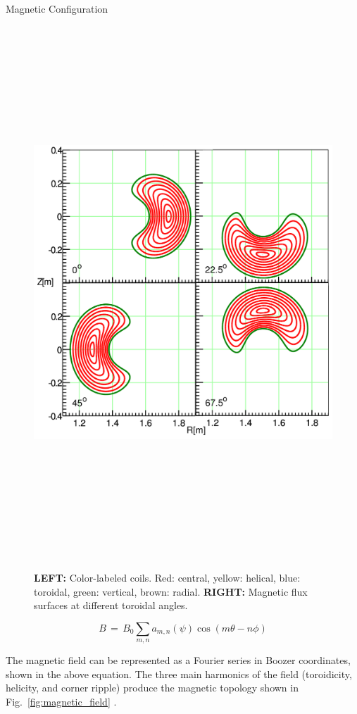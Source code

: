 \documentclass{beamer}
\newlength{\onecolwid}
\begin{document}
\begin{frame}[t]
\begin{columns}[t]
\begin{column}{\onecolwid}
\begin{block}{Magnetic Configuration}
\begin{figure}
{		\includegraphics[height=20cm]{../Graphics/flux_surfaces.png}
	}
	\caption{\textbf{LEFT:} Color-labeled coils. Red: central, yellow: helical, blue: toroidal, green: vertical, brown: radial. \textbf{RIGHT:} Magnetic flux surfaces at different toroidal angles.}
	\label{fig:magnetic_coils}
\end{figure}
\vspace{-0.2cm}
\begin{equation*}
	B \,=\, B_0 \sum_{m,n} a_{m,n}\left(\psi\right) \cos\left(m\theta - n\phi\right)
\end{equation*}

\hspace{32pt} The magnetic field can be represented as a Fourier series in Boozer coordinates, shown in the above equation. The three main harmonics of the field (toroidicity, helicity, and corner ripple) produce the magnetic topology shown in Fig.~\ref{fig:magnetic_field} \cite{solano_study_1988}.


\end{block}
\end{column}
\end{columns}
\end{frame}
\end{document}
